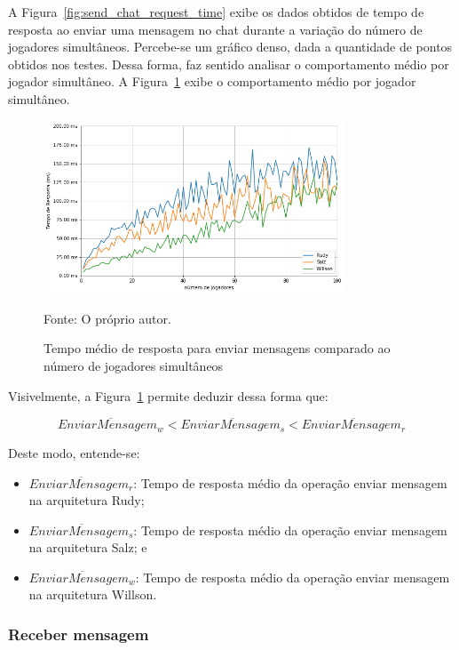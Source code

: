 A Figura~\ref{fig:send_chat_request_time} exibe os dados obtidos de tempo de resposta ao enviar uma mensagem no chat durante a variação do número de jogadores simultâneos.
%
Percebe-se um gráfico denso, dada a quantidade de pontos obtidos nos testes.
%
Dessa forma, faz sentido analisar o comportamento médio por jogador simultâneo.
%
A Figura~\ref{fig:send_chat_request_time_per_concurrency} exibe o comportamento médio por jogador simultâneo.


\begin{figure}[htb!]
  \caption{Tempo médio de resposta para enviar mensagens comparado ao número de jogadores simultâneos}
  \label{fig:send_chat_request_time_per_concurrency}
  \includegraphics[width=0.8\textwidth]{figuras/analise/rt/send_chat_request_time_per_concurrency}
  \centering

  Fonte: O próprio autor.
\end{figure}

Visivelmente, a Figura~\ref{fig:send_chat_request_time_per_concurrency} permite deduzir dessa forma que:

$$
  \overline{EnviarMensagem_{w}} < \overline{EnviarMensagem_{s}} <\overline{EnviarMensagem_{r}}
$$

Deste modo, entende-se:

\begin{itemize}
 \item $\overline{EnviarMensagem_{r}}$: Tempo de resposta médio da operação enviar mensagem na arquitetura Rudy;
 \item $\overline{EnviarMensagem_{s}}$: Tempo de resposta médio da operação enviar mensagem na arquitetura Salz; e
 \item $\overline{EnviarMensagem_{w}}$: Tempo de resposta médio da operação enviar mensagem na arquitetura Willson.
\end{itemize}

\subsubsection{Receber mensagem}

